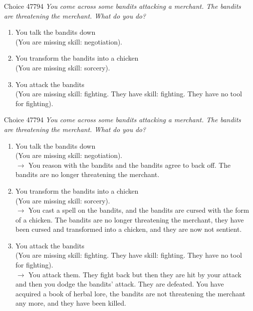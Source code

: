 \documentclass[xcolor=x11names]{beamer}
\newcommand{\choicecount}[1]{\fbox{\upshape \sffamily #1}}
\begin{document}
\begin{frame}{Choice 47794}
\scriptsize
\itshape
You come across some bandits attacking a merchant.
% 
The bandits are threatening the merchant.
% 
What do you do?

\begin{enumerate}
\item You talk the bandits down  \\
(You are missing skill: negotiation). \\[0.3em]
\item You transform the bandits into a chicken  \\
(You are missing skill: sorcery). \\[0.3em]
\item You attack the bandits  \\
(You are missing skill: fighting. They have skill: fighting. They have no tool for fighting). \\[0.3em]
\end{enumerate}
\end{frame}

\begin{frame}{Choice 47794}
\scriptsize
\itshape
You come across some bandits attacking a merchant.
% 
The bandits are threatening the merchant.
% 
What do you do?

\begin{enumerate}
\item You talk the bandits down  \\
(You are missing skill: negotiation). \\[0.3em]
\choicecount{6}$\rightarrow$ You reason with the bandits and the bandits agree to back off.  The bandits are no longer threatening the merchant. \\[-0.5em]
\item You transform the bandits into a chicken  \\
(You are missing skill: sorcery). \\[0.3em]
\choicecount{1}$\rightarrow$ You cast a spell on the bandits, and the bandits are cursed with the form of a chicken. The bandits are no longer threatening the merchant, they have been cursed and transformed into a chicken, and they are now not sentient. \\[-0.5em]
\item You attack the bandits  \\
(You are missing skill: fighting. They have skill: fighting. They have no tool for fighting). \\[0.3em]
\choicecount{3}$\rightarrow$ You attack them. They fight back but then they are hit by your attack and then you dodge the bandits' attack. They are defeated. You have acquired a book of herbal lore, the bandits are not threatening the merchant any more, and they have been killed.
\end{enumerate}
\end{frame}
\end{document}
